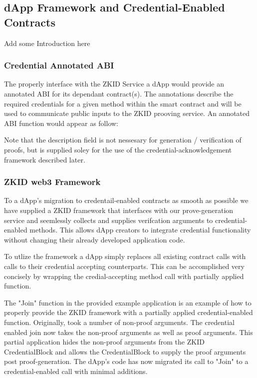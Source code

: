 \documentclass[11 pt]{extarticle}
\theoremstyle{remark}
\begin{document}
\subsection{dApp Framework and Credential-Enabled Contracts}

Add some Introduction here

\subsubsection{Credential Annotated ABI}
The properly interface with the ZKID Service a dApp would provide an annotated ABI for its dependant contract(s).
The annotations describe the required credentials for a given method within the smart contract and will
be used to communicate public inputs to the ZKID prooving service. An annotated ABI function
would appear as follow:

Note that the description field is not nessesary for generation / verification of proofs, but is supplied soley for
the use of the credential-acknowledgement framework described later. 

\subsubsection{ZKID web3 Framework}

To a dApp's migration to credentail-enabled contracts as smooth as possible we have supplied a ZKID framework that interfaces
with our prove-generation service and seemlessly collects and supplies verifcation arguments to credential-enabled methods. This 
allows dApp creators to integrate credential functionality without changing their already developed application code.

To utlize the framework a dApp simply replaces all existing contract calls with calls to their credential accepting counterparts. 
This can be accomplished very concisely by wrapping the credial-accepting method call with partially applied
function.

The "Join" function in the provided example application is an example of how to properly provide the ZKID framework with a partially applied credential-enabled function. Originally, took a number of non-proof arguments. 
The credential enabled join now takes the non-proof arguments as well as proof arguments. This partial application hides the non-proof arguments from the ZKID CredentialBlock and allows the CredentialBlock to 
supply the proof arguments post proof-generation. The dApp's code has now migrated its call to "Join" to a credential-enabled call with minimal additions.
\end{document}
